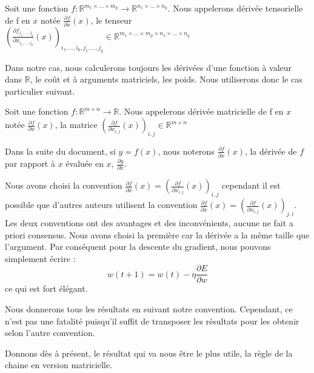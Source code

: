 \begin{definition}
Soit une fonction $f : \mathbb{R}^{m_1 \times ... \times m_p} \rightarrow \mathbb{R}^{n_1 \times ... \times n_q}$. Nous appelerons dérivée tensorielle de f en $x$ notée $\frac{\partial f}{\partial x}(x)$, le tenseur $(\frac{\partial f_{j_1, ..., j_q}}{\partial x_{i_1, ..., i_p}}(x))_{i_1, ..., i_p, j_1, ..., j_q} \in  \mathbb{R}^{m_1 \times ... \times m_p \times n_1 \times ... \times n_q}$ 
\end{definition}

Dans notre cas, nous calculerons toujours les dérivées d'une fonction à valeur dans $\mathbb{R}$, le coût et à arguments matriciels, les poids. Nous utiliserons donc le cas particulier suivant.

\begin{definition}
Soit une fonction $f : \mathbb{R}^{m \times n} \rightarrow \mathbb{R}$. Nous appelerons dérivée matricielle de f en $x$ notée $\frac{\partial f}{\partial x}(x)$, la matrice $(\frac{\partial f}{\partial x_{i, j}}(x))_{i, j} \in  \mathbb{R}^{m \times n}$ 
\end{definition}

\begin{remark}
Dans la suite du document, si $y = f(x)$, nous noterons $\frac{\partial f}{\partial x}(x)$, la dérivée de $f$ par rapport à $x$ évaluée en $x$, $\frac{\partial y}{\partial x}$.
\end{remark}

\begin{remark}
Nous avons choisi la convention $\frac{\partial f}{\partial x}(x) = (\frac{\partial f}{\partial x_{i, j}}(x))_{i, j}$ cependant il est possible que d'autres auteurs utilisent la convention $\frac{\partial f}{\partial x}(x) = (\frac{\partial f}{\partial x_{i, j}}(x))_{j, i}$. Les deux conventions ont des avantages et des inconvénients, aucune ne fait a priori consensus. Nous avons choisi la première car la dérivée a la même taille que l'argument. Par conséquent pour la descente du gradient, nous pouvons simplement écrire :
$$
w(t+1) = w(t) - \eta \frac{\partial E}{\partial w} 
$$
ce qui est fort élégant.

Nous donnerons tous les résultats en suivant notre convention. Cependant, ce n'est pas une fatalité puisqu'il suffit de transposer les résultats pour les obtenir selon l'autre convention.
\end{remark}

Donnons dès à présent, le résultat qui va nous être le plus utile, la règle de la chaine en version matricielle.

